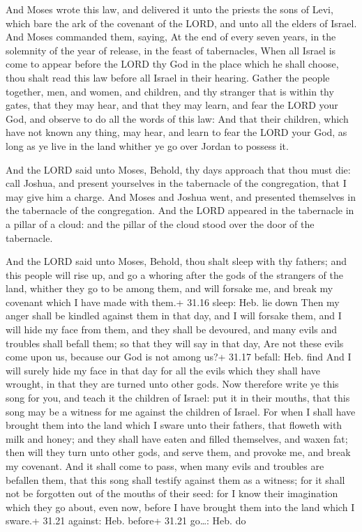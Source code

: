  And Moses wrote this law, and delivered it unto the
priests the sons of Levi, which bare the ark of the covenant of the
LORD, and unto all the elders of Israel.  And Moses
commanded them, saying, At the end of every seven years, in the
solemnity of the year of release, in the feast of tabernacles,
 When all Israel is come to appear before the LORD thy God
in the place which he shall choose, thou shalt read this law before all
Israel in their hearing.  Gather the people together, men,
and women, and children, and thy stranger that is within thy gates, that
they may hear, and that they may learn, and fear the LORD your God, and
observe to do all the words of this law:  And that their
children, which have not known any thing, may hear, and learn to fear
the LORD your God, as long as ye live in the land whither ye go over
Jordan to possess it.

 And the LORD said unto Moses, Behold, thy days approach
that thou must die: call Joshua, and present yourselves in the
tabernacle of the congregation, that I may give him a charge. And Moses
and Joshua went, and presented themselves in the tabernacle of the
congregation.  And the LORD appeared in the tabernacle in a
pillar of a cloud: and the pillar of the cloud stood over the door of
the tabernacle.

 And the LORD said unto Moses, Behold, thou shalt sleep
with thy fathers; and this people will rise up, and go a whoring after
the gods of the strangers of the land, whither they go to be among them,
and will forsake me, and break my covenant which I have made with them.+
31.16 sleep: Heb. lie down  Then my anger shall be kindled
against them in that day, and I will forsake them, and I will hide my
face from them, and they shall be devoured, and many evils and troubles
shall befall them; so that they will say in that day, Are not these
evils come upon us, because our God is not among us?+ 31.17 befall: Heb.
find  And I will surely hide my face in that day for all
the evils which they shall have wrought, in that they are turned unto
other gods.  Now therefore write ye this song for you, and
teach it the children of Israel: put it in their mouths, that this song
may be a witness for me against the children of Israel. 
For when I shall have brought them into the land which I sware unto
their fathers, that floweth with milk and honey; and they shall have
eaten and filled themselves, and waxen fat; then will they turn unto
other gods, and serve them, and provoke me, and break my covenant.
 And it shall come to pass, when many evils and troubles
are befallen them, that this song shall testify against them as a
witness; for it shall not be forgotten out of the mouths of their seed:
for I know their imagination which they go about, even now, before I
have brought them into the land which I sware.+ 31.21 against: Heb.
before+ 31.21 go\ldots: Heb. do

